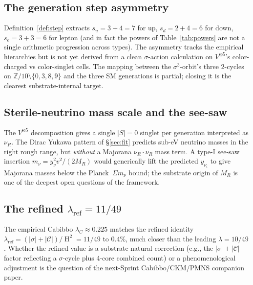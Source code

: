 \documentclass[11pt,reqno]{amsart}
\theoremstyle{plain}
\theoremstyle{definition}
\theoremstyle{remark}
\newcommand{\Z}{\mathbb{Z}}
\DeclareMathOperator{\HARM}{H}    %
\newcommand{\Cfour}{\mathcal{C}}  %
\begin{document}
\subsection{The generation step asymmetry}
Definition~\ref{def:step} extracts $s_{u} = 3+4 = 7$ for up,
$s_{d} = 2+4 = 6$ for down, $s_{e} = 3+3 = 6$ for lepton (and
in fact the powers of Table~\ref{tab:powers} are not a single
arithmetic progression across types). The asymmetry tracks the
empirical hierarchies but is not yet derived from a clean
$\sigma$-action calculation on $V^{\otimes 5}$'s color-charged
vs color-singlet cells. The mapping between the
$\sigma^{3}$-orbit's three $2$-cycles on $\Z/10\setminus\{0,3,8,9\}$
and the three SM generations is partial; closing it is the
clearest substrate-internal target.

\subsection{Sterile-neutrino mass scale and the see-saw}
The $V^{\otimes 5}$ decomposition gives a single $|S|=0$
singlet per generation interpreted as $\nu_{R}$. The Dirac
Yukawa pattern of \S\ref{sec:fit} predicts sub-eV neutrino
masses in the right rough range, but \emph{without} a Majorana
$\nu_{R} \cdot \nu_{R}$ mass term. A type-I see-saw insertion
$m_{\nu} = y_{\nu}^{2} v^{2}/(2 M_{R})$ would generically lift
the predicted $y_{\nu_{i}}$ to give Majorana masses below the
Planck~$\Sigma m_{\nu}$ bound; the substrate origin of $M_{R}$
is one of the deepest open questions of the framework.

\subsection{The refined $\lambda_{\mathrm{ref}} = 11/49$}
The empirical Cabibbo $\lambda_{C} \approx 0.225$ matches the
refined identity $\lambda_{\mathrm{ref}} = (|\sigma| +
|\Cfour|)/\HARM^{2} = 11/49$ to $0.4\%$, much closer than the
leading $\lambda = 10/49$. Whether the refined value is a
substrate-natural correction (e.g., the $|\sigma| + |\Cfour|$
factor reflecting a $\sigma$-cycle plus $4$-core combined
count) or a phenomenological adjustment is the question of the
next-Sprint Cabibbo/CKM/PMNS companion paper.
\end{document}
